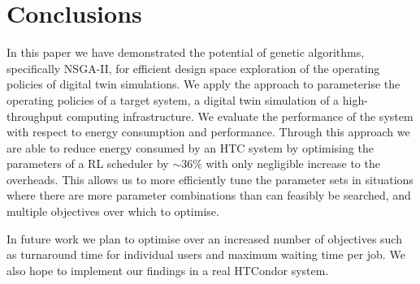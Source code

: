 \documentclass[10pt, conference, compsocconf]{IEEEtran}
\begin{document}
\section{Conclusions}
\label{conc}
In this paper we have demonstrated the potential of genetic algorithms, specifically NSGA-II, for efficient design space exploration of the operating policies of digital twin simulations. We apply the approach to parameterise the operating policies of a target system, a digital twin simulation of a high-throughput computing infrastructure. We evaluate the performance of the system with respect to energy consumption and performance. Through this approach we are able to reduce energy consumed by an HTC system by optimising the parameters of a RL scheduler by ${\sim}36\%$ with only negligible increase to the overheads. This allows us to more efficiently tune the parameter sets in situations where there are more parameter combinations than can feasibly be searched, and multiple objectives over which to optimise. 

In future work we plan to optimise over an increased number of objectives such as turnaround time for individual users and maximum waiting time per job. We also hope to implement our findings in a real HTCondor system.











\let\oldthebibliography\thebibliography
\let\endoldthebibliography\endthebibliography
\renewenvironment{thebibliography}[1]{
  \begin{oldthebibliography}{#1}
    \setlength{\itemsep}{0.06em}
    \setlength{\parskip}{0.07em}
}
{
  \end{oldthebibliography}
}
\end{document}
